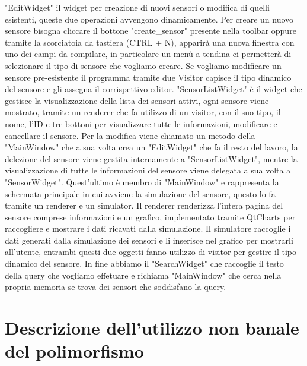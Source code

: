 \documentclass{article}
\begin{document}
"EditWidget" il widget per creazione di nuovi sensori o modifica di quelli esistenti, queste due operazioni avvengono dinamicamente. Per creare un nuovo sensore bisogna cliccare il bottone "create\_sensor" presente nella toolbar oppure tramite la scorciatoia da tastiera (CTRL + N), apparirà una nuova finestra con uno dei campi da compilare, in particolare un menù a tendina ci permetterà di selezionare il tipo di sensore che vogliamo creare. Se vogliamo modificare un sensore pre-esistente il programma tramite due Visitor capisce il tipo dinamico del sensore e gli assegna il corrispettivo editor. "SensorListWidget" è il widget che gestisce la visualizzazione della lista dei sensori attivi, ogni sensore viene mostrato, tramite un renderer che fa utilizzo di un visitor, con il suo tipo, il nome, l'ID e tre bottoni per visualizzare tutte le informazioni, modificare e cancellare il sensore. Per la modifica viene chiamato un metodo della "MainWindow" che a sua volta crea un "EditWidget" che fa il resto del lavoro, la delezione del sensore viene gestita internamente a "SensorListWidget", mentre la visualizzazione di tutte le informazioni del sensore viene delegata a sua volta a "SensorWidget". Quest'ultimo è membro di "MainWindow" e rappresenta la schermata principale in cui avviene la simulazione del sensore, questo lo fa tramite un renderer e un simulator. Il renderer renderizza l'intera pagina del sensore comprese informazioni e un grafico, implementato tramite QtCharts per raccogliere e mostrare i dati ricavati dalla simulazione. Il simulatore raccoglie i dati generati dalla simulazione dei sensori e li inserisce nel grafico per mostrarli all'utente, entrambi questi due oggetti fanno utilizzo di visitor per gestire il tipo dinamico del sensore. In fine abbiamo il "SearchWidget" che raccoglie il testo della query che vogliamo effetuare e richiama "MainWindow" che cerca nella propria memoria se trova dei sensori che soddisfano la query.

\section{Descrizione dell'utilizzo non banale del polimorfismo}
\end{document}
